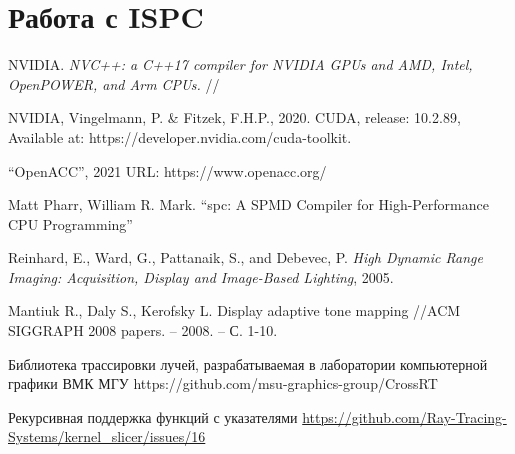 \documentclass[11pt,fleqn,english,russian]{report} %
\begin{document}
\chapter{Работа с ISPC}


\begin{thebibliography}{10}
	
	 NVIDIA. \textit{NVC++: a C++17 compiler for NVIDIA GPUs and AMD, Intel, OpenPOWER, and Arm CPUs.} // 	
	
	 NVIDIA, Vingelmann, P. \& Fitzek, F.H.P., 2020. CUDA, release: 10.2.89, Available at: https://developer.nvidia.com/cuda-toolkit.	
	
	 ``OpenACC'', 2021 URL: https://www.openacc.org/
	
	 Matt Pharr, William R. Mark. ``spc: A SPMD Compiler for High-Performance CPU Programming''
	
	 Reinhard, E., Ward, G., Pattanaik, S., and Debevec, P. \textit{High Dynamic Range Imaging: Acquisition, Display and Image-Based Lighting}, 2005.
	
	 Mantiuk R., Daly S., Kerofsky L. Display adaptive tone mapping //ACM SIGGRAPH 2008 papers. – 2008. – С. 1-10.
	
	 Библиотека трассировки лучей, разрабатываемая в лаборатории компьютерной графики ВМК МГУ https://github.com/msu-graphics-group/CrossRT
	
	 Рекурсивная поддержка функций с указателями \href{https://github.com/Ray-Tracing-Systems/kernel_slicer/issues/16}{https://github.com/Ray-Tracing-Systems/kernel\_slicer/issues/16}
	
\end{thebibliography}
\end{document}
